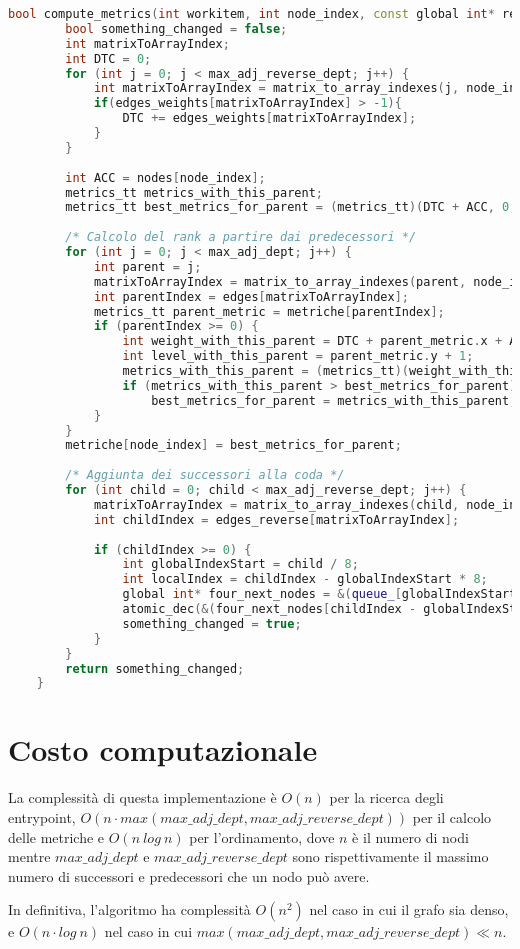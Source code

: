 \begin{lstlisting}[language=C++, caption={compute\_metrics\_vectorized8 kernel internal function},captionpos=b]
	bool compute_metrics(int workitem, int node_index, const global int* restrict nodes, global int8* restrict queue_, const int n_nodes, const global edge_t* restrict edges, const global edge_t* restrict edges_reverse, const global edge_t* restrict edges_weights, global metrics_tt* metriche, const int max_adj_dept, const int max_adj_reverse_dept){
		bool something_changed = false;
		int matrixToArrayIndex;
		int DTC = 0; 
		for (int j = 0; j < max_adj_reverse_dept; j++) {
			int matrixToArrayIndex = matrix_to_array_indexes(j, node_index, n_nodes);
			if(edges_weights[matrixToArrayIndex] > -1){
				DTC += edges_weights[matrixToArrayIndex];
			}
		}
		
		int ACC = nodes[node_index];
		metrics_tt metrics_with_this_parent;
		metrics_tt best_metrics_for_parent = (metrics_tt)(DTC + ACC, 0, ACC);
		
		/* Calcolo del rank a partire dai predecessori */
		for (int j = 0; j < max_adj_dept; j++) {
			int parent = j;
			matrixToArrayIndex = matrix_to_array_indexes(parent, node_index, n_nodes);
			int parentIndex = edges[matrixToArrayIndex];
			metrics_tt parent_metric = metriche[parentIndex];
			if (parentIndex >= 0) {
				int weight_with_this_parent = DTC + parent_metric.x + ACC;
				int level_with_this_parent = parent_metric.y + 1;
				metrics_with_this_parent = (metrics_tt)(weight_with_this_parent, level_with_this_parent, node_index);
				if (metrics_with_this_parent > best_metrics_for_parent)
					best_metrics_for_parent = metrics_with_this_parent;
			}
		}
		metriche[node_index] = best_metrics_for_parent;
		
		/* Aggiunta dei successori alla coda */
		for (int child = 0; child < max_adj_reverse_dept; j++) {
			matrixToArrayIndex = matrix_to_array_indexes(child, node_index, n_nodes);
			int childIndex = edges_reverse[matrixToArrayIndex];
			
			if (childIndex >= 0) {
				int globalIndexStart = child / 8;
				int localIndex = childIndex - globalIndexStart * 8;
				global int* four_next_nodes = &(queue_[globalIndexStart]);
				atomic_dec(&(four_next_nodes[childIndex - globalIndexStart * 8]));
				something_changed = true;
			}
		}
		return something_changed;
	}
\end{lstlisting}
\newpage
\section{Costo computazionale}
\label{analisicomputazionale}
La complessità di questa implementazione è $O(n)$ per la ricerca degli entrypoint, $O(n \cdot max(max\_adj\_dept, max\_adj\_reverse\_dept))$ per il calcolo delle metriche e $O(n\ log\ n)$ per l'ordinamento, dove $n$ è il numero di nodi mentre $max\_adj\_dept$ e $max\_adj\_reverse\_dept$ sono rispettivamente il massimo numero di successori e predecessori che un nodo può avere.

In definitiva, l'algoritmo ha complessità $O(n^{2})$ nel caso in cui il grafo sia denso, e $O(n \cdot log\ n)$ nel caso in cui $max(max\_adj\_dept, max\_adj\_reverse\_dept) \ll n$.